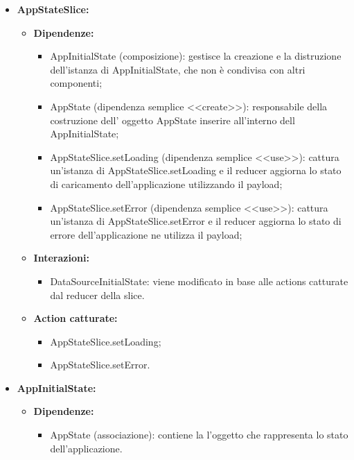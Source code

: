 \begin{itemize}
    \item \textbf{AppStateSlice:}
    \begin{itemize}
        \item \textbf{Dipendenze:}
        \begin{itemize}
            \item AppInitialState (composizione): gestisce la creazione e la distruzione dell'istanza di AppInitialState, che non è condivisa con altri componenti;
            \item AppState (dipendenza semplice <<create>>): responsabile della costruzione dell' oggetto AppState inserire all’interno dell AppInitialState;
            \item AppStateSlice.setLoading (dipendenza semplice <<use>>): cattura un’istanza di AppStateSlice.setLoading e il reducer aggiorna lo stato di caricamento dell'applicazione utilizzando il payload;
            \item AppStateSlice.setError (dipendenza semplice <<use>>): cattura un’istanza di AppStateSlice.setError e il reducer aggiorna lo stato di errore dell'applicazione ne utilizza il payload;
        \end{itemize} 
        \item \textbf{Interazioni:}
        \begin{itemize}
            \item DataSourceInitialState: viene modificato in base alle actions catturate dal reducer della slice.
        \end{itemize} 
        \item \textbf{Action catturate:}
        \begin{itemize}
            \item AppStateSlice.setLoading;
            \item AppStateSlice.setError.
        \end{itemize} 
    \end{itemize}

    
    \item \textbf{AppInitialState:}
    \begin{itemize}
        \item \textbf{Dipendenze:}
        \begin{itemize}
            \item AppState (associazione): contiene la l'oggetto che rappresenta lo stato dell'applicazione.
        \end{itemize} 
    \end{itemize}


\end{itemize}
